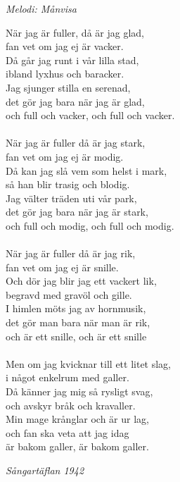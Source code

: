 {\footnotesize\textit{Melodi: Månvisa}}\par
\vspace{10pt}
När jag är fuller, då är jag glad,\\
fan vet om jag ej är vacker.\\
Då går jag runt i vår lilla stad,\\
ibland lyxhus och baracker.\\
Jag sjunger stilla en serenad,\\
det gör jag bara när jag är glad,\\
och full och vacker, och full och vacker.\\
\\
När jag är fuller då är jag stark,\\
fan vet om jag ej är modig.\\
Då kan jag slå vem som helst i mark,\\
så han blir trasig och blodig.\\
Jag välter träden uti vår park,\\
det gör jag bara när jag är stark,\\
och full och modig, och full och modig.\\
\\
När jag är fuller då är jag rik,\\
fan vet om jag ej är snille.\\
Och dör jag blir jag ett vackert lik,\\
begravd med gravöl och gille.\\
I himlen möts jag av hornmusik,\\
det gör man bara när man är rik,\\
och är ett snille, och är ett snille\\
\\
Men om jag kvicknar till ett litet slag,\\
i något enkelrum med galler.\\
Då känner jag mig så rysligt svag,\\
och avskyr bråk och kravaller.\\
Min mage krånglar och är ur lag,\\
och fan ska veta att jag idag\\
är bakom galler, är bakom galler.
\par
\vspace{10pt}
{\footnotesize\textit{Sångartäflan 1942}}
